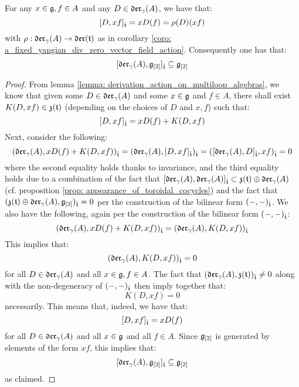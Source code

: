         \begin{lemma} \label{lemma: no_polynomial_terms_for_derivation_action_on_multiloop_algebras}
            For any $x \in \mathfrak{g}, f \in A$ and any $D \in \mathfrak{der}_{\gamma}(A)$, we have that:
                $$[D, xf]_{\hat{\mathfrak{t}}} = x D(f) = \rho(D)(xf)$$
            with $\rho: \mathfrak{der}_{\gamma}(A) \to \mathfrak{der}(\mathfrak{t})$ as in corollary \ref{coro: a_fixed_yangian_div_zero_vector_field_action}. Consequently one has that:
                $$[\mathfrak{der}_{\gamma}(A), \mathfrak{g}_{[2]}]_{\hat{\mathfrak{t}}} \subseteq \mathfrak{g}_{[2]}$$
        \end{lemma}
            \begin{proof}
                From lemma \ref{lemma: derivation_action_on_multiloop_algebras}, we know that given some $D \in \mathfrak{der}_{\gamma}(A)$ and some $x \in \mathfrak{g}$ and $f \in A$, there shall exist $K(D, xf) \in \mathfrak{z}(\mathfrak{t})$ (depending on the choices of $D$ and $x, f$) such that:
                    $$[D, xf]_{\hat{\mathfrak{t}}} = x D(f) + K(D, xf)$$
                Next, consider the following:
                    $$( \mathfrak{der}_{\gamma}(A), x D(f) + K(D, xf) )_{\hat{\mathfrak{t}}} = ( \mathfrak{der}_{\gamma}(A), [D, xf]_{\hat{\mathfrak{t}}} )_{\hat{\mathfrak{t}}} = ( [\mathfrak{der}_{\gamma}(A), D]_{\hat{\mathfrak{t}}}, xf )_{\hat{\mathfrak{t}}} = 0$$
                where the second equality holds thanks to invariance, and the third equality holds due to a combination of the fact that $[\mathfrak{der}_{\gamma}(A), \mathfrak{der}_{\gamma}(A)]_{\hat{\mathfrak{t}}} \subset \mathfrak{z}(\mathfrak{t}) \oplus \mathfrak{der}_{\gamma}(A)$ (cf. proposition \ref{prop: appearance_of_toroidal_cocycles}) and the fact that $(\mathfrak{z}(\mathfrak{t}) \oplus \mathfrak{der}_{\gamma}(A), \mathfrak{g}_{[2]})_{\hat{\mathfrak{t}}} = 0$ per the construction of the bilinear form $(-, -)_{\hat{\mathfrak{t}}}$. We also have the following, again per the construction of the bilinear form $(-, -)_{\hat{\mathfrak{t}}}$:
                    $$( \mathfrak{der}_{\gamma}(A), x D(f) + K(D, xf) )_{\hat{\mathfrak{t}}} = ( \mathfrak{der}_{\gamma}(A), K(D, xf) )_{\hat{\mathfrak{t}}}$$
                This implies that:
                    $$( \mathfrak{der}_{\gamma}(A), K(D, xf) )_{\hat{\mathfrak{t}}} = 0$$
                for all $D \in \mathfrak{der}_{\gamma}(A)$ and all $x \in \mathfrak{g}, f \in A$. The fact that $( \mathfrak{der}_{\gamma}(A), \mathfrak{z}(\mathfrak{t}) )_{\hat{\mathfrak{t}}} \not = 0$ along with the non-degeneracy of $(-, -)_{\hat{\mathfrak{t}}}$ then imply together that:
                    $$K(D, xf) = 0$$
                necessarily. This means that, indeed, we have that:
                    $$[D, xf]_{\hat{\mathfrak{t}}} = x D(f)$$
                for all $D \in \mathfrak{der}_{\gamma}(A)$ and all $x \in \mathfrak{g}$ and all $f \in A$. Since $\mathfrak{g}_{[2]}$ is generated by elements of the form $xf$, this implies that:
                    $$[\mathfrak{der}_{\gamma}(A), \mathfrak{g}_{[2]}]_{\hat{\mathfrak{t}}} \subseteq \mathfrak{g}_{[2]}$$
                as claimed. 
            \end{proof}
